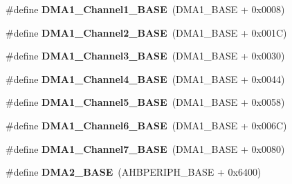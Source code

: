 \begin{DoxyCompactItemize}
\item 
\hypertarget{group___peripheral__memory__map_ga888dbc1608243badeb3554ffedc7364c}{\#define {\bfseries D\-M\-A1\-\_\-\-Channel1\-\_\-\-B\-A\-S\-E}~(D\-M\-A1\-\_\-\-B\-A\-S\-E + 0x0008)}\label{group___peripheral__memory__map_ga888dbc1608243badeb3554ffedc7364c}

\item 
\hypertarget{group___peripheral__memory__map_ga38a70090eef3687e83fa6ac0c6d22267}{\#define {\bfseries D\-M\-A1\-\_\-\-Channel2\-\_\-\-B\-A\-S\-E}~(D\-M\-A1\-\_\-\-B\-A\-S\-E + 0x001\-C)}\label{group___peripheral__memory__map_ga38a70090eef3687e83fa6ac0c6d22267}

\item 
\hypertarget{group___peripheral__memory__map_ga70b3d9f36ca9ce95b4e421c11154fe5d}{\#define {\bfseries D\-M\-A1\-\_\-\-Channel3\-\_\-\-B\-A\-S\-E}~(D\-M\-A1\-\_\-\-B\-A\-S\-E + 0x0030)}\label{group___peripheral__memory__map_ga70b3d9f36ca9ce95b4e421c11154fe5d}

\item 
\hypertarget{group___peripheral__memory__map_ga1adc93cd0baf0897202c71110e045692}{\#define {\bfseries D\-M\-A1\-\_\-\-Channel4\-\_\-\-B\-A\-S\-E}~(D\-M\-A1\-\_\-\-B\-A\-S\-E + 0x0044)}\label{group___peripheral__memory__map_ga1adc93cd0baf0897202c71110e045692}

\item 
\hypertarget{group___peripheral__memory__map_gac041a71cd6c1973964f847a68aa14478}{\#define {\bfseries D\-M\-A1\-\_\-\-Channel5\-\_\-\-B\-A\-S\-E}~(D\-M\-A1\-\_\-\-B\-A\-S\-E + 0x0058)}\label{group___peripheral__memory__map_gac041a71cd6c1973964f847a68aa14478}

\item 
\hypertarget{group___peripheral__memory__map_ga896c2c7585dd8bc3969cf8561f689d2d}{\#define {\bfseries D\-M\-A1\-\_\-\-Channel6\-\_\-\-B\-A\-S\-E}~(D\-M\-A1\-\_\-\-B\-A\-S\-E + 0x006\-C)}\label{group___peripheral__memory__map_ga896c2c7585dd8bc3969cf8561f689d2d}

\item 
\hypertarget{group___peripheral__memory__map_gaeee0d1f77d0db1db533016a09351166c}{\#define {\bfseries D\-M\-A1\-\_\-\-Channel7\-\_\-\-B\-A\-S\-E}~(D\-M\-A1\-\_\-\-B\-A\-S\-E + 0x0080)}\label{group___peripheral__memory__map_gaeee0d1f77d0db1db533016a09351166c}

\item 
\hypertarget{group___peripheral__memory__map_gab72a9ae145053ee13d1d491fb5c1df64}{\#define {\bfseries D\-M\-A2\-\_\-\-B\-A\-S\-E}~(A\-H\-B\-P\-E\-R\-I\-P\-H\-\_\-\-B\-A\-S\-E + 0x6400)}\label{group___peripheral__memory__map_gab72a9ae145053ee13d1d491fb5c1df64}


\end{DoxyCompactItemize}
